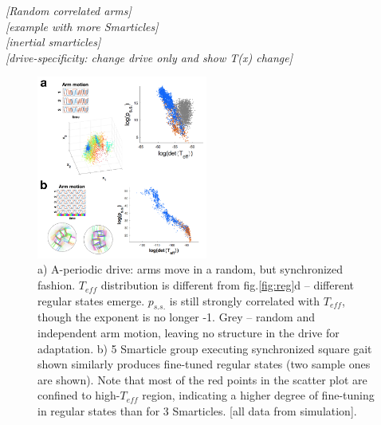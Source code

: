\documentclass[reprint,prx]{revtex4-1}
\renewcommand{\=}[1]{\stackrel{#1}{=}} %
\renewcommand{\(}{\left (}
\renewcommand{\)}{\right  )}
\renewcommand{\[}{\left [}
\renewcommand{\]}{\right ]}
\newcommand{\<}{\left <}
\renewcommand{\>}{\right >}
\theoremstyle{definition}
\theoremstyle{remark}
\renewcommand{\todo}[1]{\textit{\color{red}[#1]}}
\begin{document}
\todo{Random correlated arms}\\
\todo{example with more Smarticles}\\
\todo{inertial smarticles}\\
\todo{drive-specificity: change drive only and show T(x) change}
\begin{figure}
	\includegraphics[width=0.5\textwidth]{otherRuns.png}
	\caption{a) A-periodic drive: arms move in a random, but synchronized fashion. $ T_{eff} $ distribution is different from fig.\ref{fig:reg}d -- different regular states emerge. $ p_{s.s.} $ is still strongly correlated with $ T_{eff} $, though the exponent is no longer -1. Grey -- random and independent arm motion, leaving no structure in the drive for adaptation. b) 5 Smarticle group executing synchronized square gait shown similarly produces fine-tuned regular states (two sample ones are shown). Note that most of the red points in the scatter plot are confined to high-$ T_{eff} $ region, indicating a higher degree of fine-tuning in regular states than for 3 Smarticles. [all data from simulation].
	}
	\label{fig:otherRun}
\end{figure}
\end{document}
